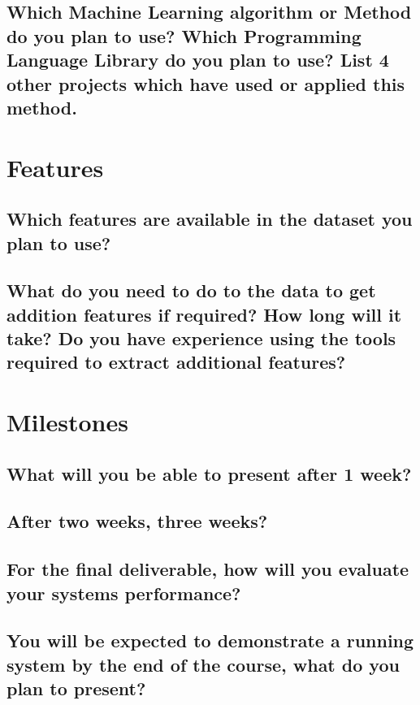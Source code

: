 \documentclass[paper=a4, fontsize=11pt]{scrartcl} %
\begin{document}
\subsection{Which Machine Learning algorithm or Method do you plan to use? Which Programming Language Library do you plan to use? List 4 other projects which have used or applied this method.}

\section{Features}

\subsection{Which features are available in the dataset you plan to use?}

\subsection{What do you need to do to the data to get addition features if required? How long will it take? Do you have experience using the tools required to extract additional features?}

\section{Milestones}

\subsection{What will you be able to present after 1 week?}

\subsection{After two weeks, three weeks?}

\subsection{For the final deliverable, how will you evaluate your systems performance?}

\subsection{You will be expected to demonstrate a running system by the end of the course, what do you plan to present?}
\end{document}
